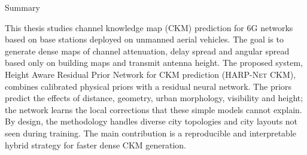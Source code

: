 \begin{center}
  \huge\bfseries\raggedright\vspace*{.5\baselineskip} Summary~\hrulefill
\end{center}
This thesis studies channel knowledge map (CKM) prediction for 6G networks
based on base stations deployed on unmanned aerial vehicles. The goal is to
generate dense maps of channel attenuation, delay spread and angular spread
based only on building maps and transmit antenna height. The proposed system,
Height Aware Residual Prior Network for CKM prediction (\textsc{HARP-Net CKM}),
combines calibrated physical priors with a residual neural network. The priors
predict the effects of distance, geometry, urban morphology, visibility and
height; the network learns the local corrections that these simple models
cannot explain. By design, the methodology handles diverse city topologies and
city layouts not seen during training. The main contribution is a reproducible
and interpretable hybrid strategy for faster dense CKM generation.
